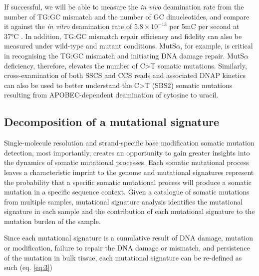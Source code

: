If successful, we will be able to measure the \textit{in vivo} deamination rate from the number of TG:GC mismatch and the number of GC dinucleotides, and compare it against the \textit{in vitro} deamination rate of $5.8\times10^{-13}$ per 5mC per second at 37°C \cite{Shen1994-of}. In addition, TG:GC mismatch repair efficiency and fidelity can also be measured under wild-type and mutant conditions. MutS$\alpha$, for example, is critical in recognising the TG:GC mismatch and initiating DNA damage repair. MutS$\alpha$ deficiency, therefore, elevates the number of C>T somatic mutations. Similarly, cross-examination of both SSCS and CCS reads and associated DNAP kinetics can also be used to better understand the C>T (SBS2) somatic mutations resulting from APOBEC-dependent deamination of cytosine to uracil.  

\subsection{Decomposition of a mutational signature}

Single-molecule resolution and strand-specific base modification somatic mutation detection, most importantly, creates an opportunity to gain greater insights into the dynamics of somatic mutational processes. Each somatic mutational process leaves a characteristic imprint to the genome and mutational signatures represent the probability that a specific somatic mutational process will produce a somatic mutation in a specific sequence context. Given a catalogue of somatic mutations from multiple samples, mutational signature analysis identifies the mutational signature in each sample and the contribution of each mutational signature to the mutation burden of the sample.

Since each mutational signature is a cumulative result of DNA damage, mutation or modification, failure to repair the DNA damage or mismatch, and persistence of the mutation in bulk tissue, each mutational signature can be re-defined as such (eq. \ref{eq:3})

